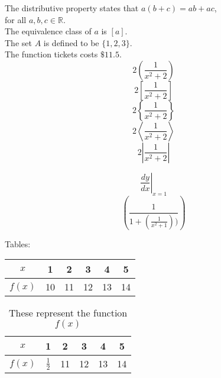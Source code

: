 \documentclass[11pt]{article}
\begin{document}
The distributive property states that $a(b+c) = ab + ac$, \\
for all $a, b, c \in \mathbb{R}$. \\[6pt]

The equivalence class of $a$ is $[a]$. \\ [6pt]

The set $A$ is defined to be $\{1, 2, 3\}$.\\[6pt]
The function tickets costs $\$11.5$. \\[6pt]

$$2\left(\frac{1}{x^2+2}\right)$$
$$2\left[\frac{1}{x^2+2}\right]$$
$$2\left\{\frac{1}{x^2+2}\right\}$$
$$2\left \langle \frac{1}{x^2+2}\right \rangle$$
$$2\left | \frac{1}{x^2+2}\right |$$

$$\left.\frac{dy}{dx}\right|_{x=1} $$
$$ \left (\frac{1} {1 +\left (\frac{1}{x^2+1} \right) )}\right)$$


Tables:\\



\begin{tabular}{|c|c|c|c|c|c|}
    \hline
    $x$ & 1 & 2 & 3 & 4 & 5 \\ \hline
    $f(x)$ & 10 & 11 & 12 & 13 & 14 \\ \hline
\end{tabular}

\vspace{1cm}

\begin{table}[H]
    \def\arraystretch{2}
    \begin{tabular}{|c||c|c|c|c|c|}
        \hline
        $x$ & 1 & 2 & 3 & 4 & 5 \\ \hline
        $f(x)$ & $\frac{1}{2}$  & 11 & 12 & 13 & 14 \\ \hline
    \end{tabular}
    \caption{These represent the function $f(x)$}
\end{table}
\end{document}
